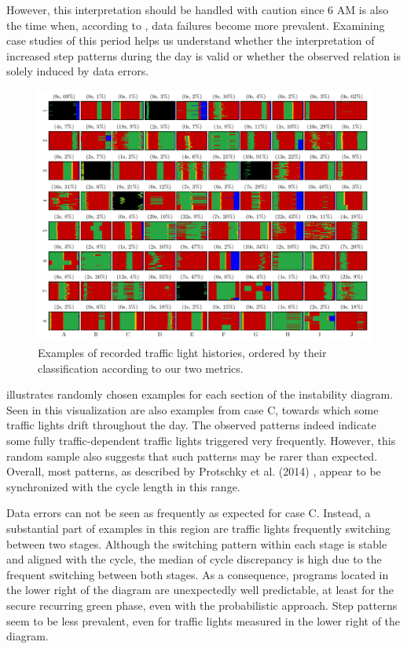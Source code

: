 However, this interpretation should be handled with caution since 6 AM is also the time when, according to , data failures become more prevalent. Examining case studies of this period helps us understand whether the interpretation of increased step patterns during the day is valid or whether the observed relation is solely induced by data errors.

\begin{figure}[t]
    \centering
    \includegraphics[width=\linewidth]{images/predictability-case-studies.pdf}
    \caption{Examples of recorded traffic light histories, ordered by their classification according to our two metrics.}\label{fig:types-of-instability}
\end{figure}

 illustrates randomly chosen examples for each section of the instability diagram. Seen in this visualization are also examples from case C, towards which some traffic lights drift throughout the day. The observed patterns indeed indicate some fully traffic-dependent traffic lights triggered very frequently. However, this random sample also suggests that such patterns may be rarer than expected. Overall, most patterns, as described by Protschky et al. (2014) \cite{protschky_extensive_2014}, appear to be synchronized with the cycle length in this range.

Data errors can not be seen as frequently as expected for case C. Instead, a substantial part of examples in this region are traffic lights frequently switching between two stages. Although the switching pattern within each stage is stable and aligned with the cycle, the median of cycle discrepancy is high due to the frequent switching between both stages. As a consequence, programs located in the lower right of the diagram are unexpectedly well predictable, at least for the secure recurring green phase, even with the probabilistic approach. Step patterns seem to be less prevalent, even for traffic lights measured in the lower right of the diagram.

